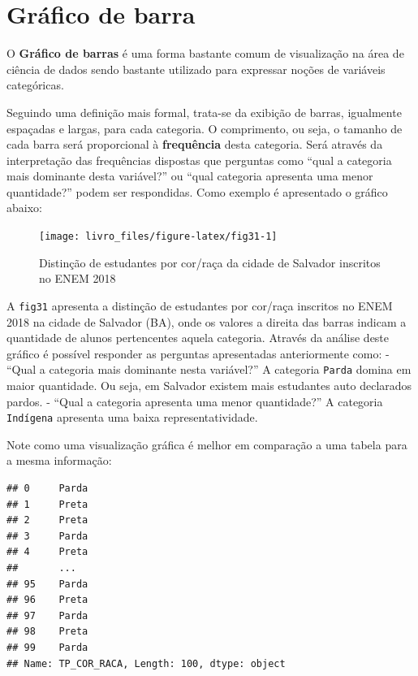 \documentclass[
]{book}
\begin{document}
\hypertarget{gruxe1fico-de-barra}{%
\section{Gráfico de barra}\label{gruxe1fico-de-barra}}

O \textbf{Gráfico de barras} é uma forma bastante comum de visualização na área de ciência de dados sendo bastante utilizado para expressar noções de variáveis categóricas.

Seguindo uma definição mais formal, trata-se da exibição de barras, igualmente espaçadas e largas, para cada categoria. O comprimento, ou seja, o tamanho de cada barra será proporcional à \textbf{frequência} desta categoria. Será através da interpretação das frequências dispostas que perguntas como ``qual a categoria mais dominante desta variável?'' ou ``qual categoria apresenta uma menor quantidade?'' podem ser respondidas. Como exemplo é apresentado o gráfico abaixo:

\begin{figure}

{\centering \texttt{[image: livro\_files/figure-latex/fig31-1]} 

}

\caption{Distinção de estudantes por cor/raça da cidade de Salvador inscritos no ENEM 2018}\label{fig:fig31}
\end{figure}

A \texttt{fig31} apresenta a distinção de estudantes por cor/raça inscritos no ENEM 2018 na cidade de Salvador (BA), onde os valores a direita das barras indicam a quantidade de alunos pertencentes aquela categoria. Através da análise deste gráfico é possível responder as perguntas apresentadas anteriormente como:
- ``Qual a categoria mais dominante nesta variável?'' A categoria \texttt{Parda} domina em maior quantidade. Ou seja, em Salvador existem mais estudantes auto declarados pardos.
- ``Qual a categoria apresenta uma menor quantidade?'' A categoria \texttt{Indígena} apresenta uma baixa representatividade.

Note como uma visualização gráfica é melhor em comparação a uma tabela para a mesma informação:

\begin{verbatim}
## 0     Parda
## 1     Preta
## 2     Preta
## 3     Parda
## 4     Preta
##       ...  
## 95    Parda
## 96    Preta
## 97    Parda
## 98    Preta
## 99    Parda
## Name: TP_COR_RACA, Length: 100, dtype: object
\end{verbatim}
\end{document}
